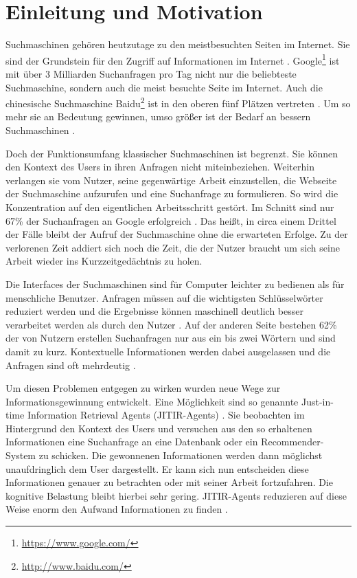 \section{Einleitung und Motivation}
Suchmaschinen gehören heutzutage zu den meistbesuchten Seiten im Internet. Sie sind der Grundstein für den Zugriff auf Informationen im Internet \cite{budzik2000user}. Google\footnote{\url{https://www.google.com/}} ist mit über 3 Milliarden Suchanfragen pro Tag \cite{medium} nicht nur die beliebteste Suchmaschine, sondern auch die meist besuchte Seite im Internet. Auch die chinesische Suchmaschine Baidu\footnote{\url{http://www.baidu.com/}} ist in den oberen fünf Plätzen vertreten \cite{alexa}. Um so mehr sie an Bedeutung gewinnen, umso größer ist der Bedarf an bessern Suchmaschinen \cite{lawrence2000context}.

Doch der Funktionsumfang klassischer Suchmaschinen ist begrenzt. Sie können den Kontext des Users in ihren Anfragen nicht miteinbeziehen. Weiterhin verlangen sie vom Nutzer, seine gegenwärtige Arbeit einzustellen, die Webseite der Suchmaschine aufzurufen und eine Suchanfrage zu formulieren. So wird die Konzentration auf den eigentlichen Arbeitsschritt gestört. Im Schnitt sind nur 67\% der Suchanfragen an Google erfolgreich \cite{winfuture}. Das heißt, in circa einem Drittel der Fälle bleibt der Aufruf der Suchmaschine ohne die erwarteten Erfolge. Zu der verlorenen Zeit addiert sich noch die Zeit, die der Nutzer braucht um sich seine Arbeit wieder ins Kurzzeitgedächtnis zu holen.

Die Interfaces der Suchmaschinen sind für Computer leichter zu bedienen als für menschliche Benutzer. Anfragen müssen auf die wichtigsten Schlüsselwörter reduziert werden und die Ergebnisse können maschinell deutlich besser verarbeitet werden als durch den Nutzer \cite{budzik1999watson}. Auf der anderen Seite bestehen 62\% der von Nutzern erstellen Suchanfragen nur aus ein bis zwei Wörtern \cite{jansen2000real} und sind damit zu kurz. Kontextuelle Informationen werden dabei ausgelassen und die Anfragen sind oft mehrdeutig \cite{budzik1999watson}.

Um diesen Problemen entgegen zu wirken wurden neue Wege zur Informationsgewinnung entwickelt. Eine Möglichkeit sind so genannte Just-in-time Information Retrieval Agents (JITIR-Agents) \cite{rhodes2000thesis}. Sie beobachten im Hintergrund den Kontext des Users und versuchen aus den so erhaltenen Informationen eine Suchanfrage an eine Datenbank oder ein Recommender-System zu schicken. Die gewonnenen Informationen werden dann möglichst unaufdringlich dem User dargestellt. Er kann sich nun entscheiden diese Informationen genauer zu betrachten oder mit seiner Arbeit fortzufahren. Die kognitive Belastung bleibt hierbei sehr gering. JITIR-Agents reduzieren auf diese Weise enorm den Aufwand Informationen zu finden \cite{rhodes2000just}.

